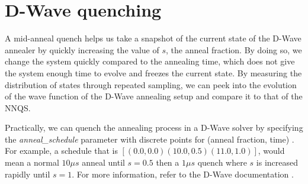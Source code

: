 \chapter{D-Wave quenching}\label{appendix:quenching}
A mid-anneal quench helps us take a snapshot of the current state of the D-Wave annealer by quickly increasing the value of $s$, the anneal fraction. By doing so, we change the system quickly compared to the annealing time, which does not give the system enough time to evolve and freezes the current state. By measuring the distribution of states through repeated sampling, we can peek into the evolution of the wave function of the D-Wave annealing setup and compare it to that of the NNQS.

Practically, we can quench the annealing process in a D-Wave solver by specifying the \textit{anneal\_schedule} parameter with discrete points for (anneal fraction, time) \cite{dwaveadvantage}. For example, a schedule that is $[(0.0,0.0)(10.0,0.5)(11.0,1.0)]$, would mean a normal $10 \mu s$ anneal until $s=0.5$ then a $1 \mu s$ quench where $s$ is increased rapidly until $s=1$. For more information, refer to the D-Wave documentation \cite{dwavequench}.